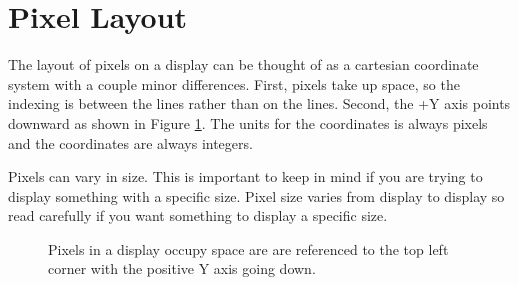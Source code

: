 \section{Pixel Layout}
The layout of pixels on a display can be thought of as a cartesian coordinate system with a couple 
minor differences. First, pixels take up space, so the indexing is between the lines rather than 
on the lines. Second, the +Y axis points downward as shown in Figure \ref{fig:pixels}. The units
for the coordinates is always pixels and the coordinates are always integers. 

Pixels can vary in size. This is important to keep in mind if you are trying to display something
with a specific size. Pixel size varies from display to display so read carefully if you want 
something to display a specific size.

\newcommand*{\xMin}{0}%
\newcommand*{\xMax}{6}%
\newcommand*{\yMin}{0}%
\newcommand*{\yMax}{6}%
\begin{figure}[!htb]
	\centering
	\caption{Pixels in a display occupy space are are referenced to the top left corner with the positive Y axis going down.}
	\label{fig:pixels}
\end{figure}

